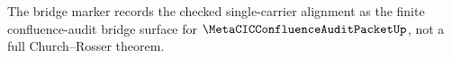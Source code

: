 The bridge marker records the checked single-carrier alignment as the finite confluence-audit bridge surface for $\MetaCICConfluenceAuditPacketUp$, not a full Church--Rosser theorem.
